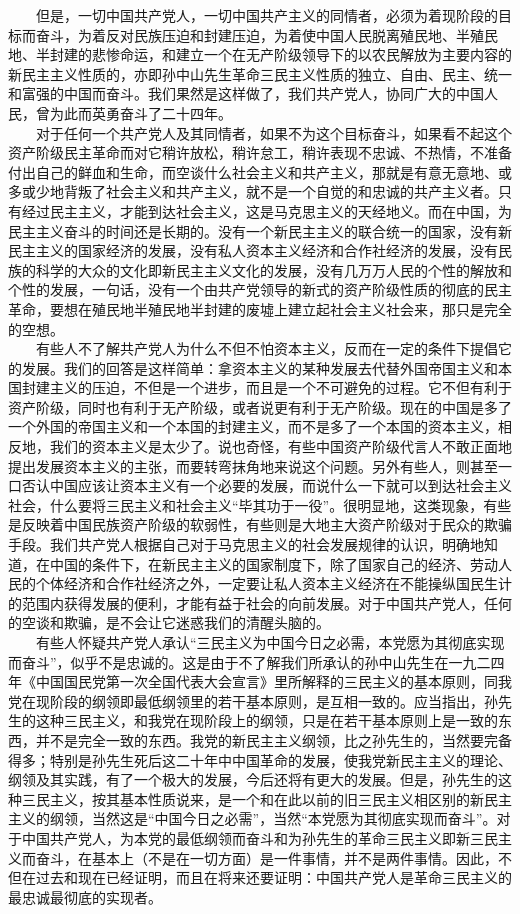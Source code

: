 \documentclass[cn,11pt,chinese]{elegantbook}
\begin{document}
　　但是，一切中国共产党人，一切中国共产主义的同情者，必须为着现阶段的目标而奋斗，为着反对民族压迫和封建压迫，为着使中国人民脱离殖民地、半殖民地、半封建的悲惨命运，和建立一个在无产阶级领导下的以农民解放为主要内容的新民主主义性质的，亦即孙中山先生革命三民主义性质的独立、自由、民主、统一和富强的中国而奋斗。我们果然是这样做了，我们共产党人，协同广大的中国人民，曾为此而英勇奋斗了二十四年。\\
　　对于任何一个共产党人及其同情者，如果不为这个目标奋斗，如果看不起这个资产阶级民主革命而对它稍许放松，稍许怠工，稍许表现不忠诚、不热情，不准备付出自己的鲜血和生命，而空谈什么社会主义和共产主义，那就是有意无意地、或多或少地背叛了社会主义和共产主义，就不是一个自觉的和忠诚的共产主义者。只有经过民主主义，才能到达社会主义，这是马克思主义的天经地义。而在中国，为民主主义奋斗的时间还是长期的。没有一个新民主主义的联合统一的国家，没有新民主主义的国家经济的发展，没有私人资本主义经济和合作社经济的发展，没有民族的科学的大众的文化即新民主主义文化的发展，没有几万万人民的个性的解放和个性的发展，一句话，没有一个由共产党领导的新式的资产阶级性质的彻底的民主革命，要想在殖民地半殖民地半封建的废墟上建立起社会主义社会来，那只是完全的空想。\\
　　有些人不了解共产党人为什么不但不怕资本主义，反而在一定的条件下提倡它的发展。我们的回答是这样简单：拿资本主义的某种发展去代替外国帝国主义和本国封建主义的压迫，不但是一个进步，而且是一个不可避免的过程。它不但有利于资产阶级，同时也有利于无产阶级，或者说更有利于无产阶级。现在的中国是多了一个外国的帝国主义和一个本国的封建主义，而不是多了一个本国的资本主义，相反地，我们的资本主义是太少了。说也奇怪，有些中国资产阶级代言人不敢正面地提出发展资本主义的主张，而要转弯抹角地来说这个问题。另外有些人，则甚至一口否认中国应该让资本主义有一个必要的发展，而说什么一下就可以到达社会主义社会，什么要将三民主义和社会主义“毕其功于一役”。很明显地，这类现象，有些是反映着中国民族资产阶级的软弱性，有些则是大地主大资产阶级对于民众的欺骗手段。我们共产党人根据自己对于马克思主义的社会发展规律的认识，明确地知道，在中国的条件下，在新民主主义的国家制度下，除了国家自己的经济、劳动人民的个体经济和合作社经济之外，一定要让私人资本主义经济在不能操纵国民生计的范围内获得发展的便利，才能有益于社会的向前发展。对于中国共产党人，任何的空谈和欺骗，是不会让它迷惑我们的清醒头脑的。\\
　　有些人怀疑共产党人承认“三民主义为中国今日之必需，本党愿为其彻底实现而奋斗”，似乎不是忠诚的。这是由于不了解我们所承认的孙中山先生在一九二四年《中国国民党第一次全国代表大会宣言》里所解释的三民主义的基本原则，同我党在现阶段的纲领即最低纲领里的若干基本原则，是互相一致的。应当指出，孙先生的这种三民主义，和我党在现阶段上的纲领，只是在若干基本原则上是一致的东西，并不是完全一致的东西。我党的新民主主义纲领，比之孙先生的，当然要完备得多；特别是孙先生死后这二十年中中国革命的发展，使我党新民主主义的理论、纲领及其实践，有了一个极大的发展，今后还将有更大的发展。但是，孙先生的这种三民主义，按其基本性质说来，是一个和在此以前的旧三民主义相区别的新民主主义的纲领，当然这是“中国今日之必需”，当然“本党愿为其彻底实现而奋斗”。对于中国共产党人，为本党的最低纲领而奋斗和为孙先生的革命三民主义即新三民主义而奋斗，在基本上（不是在一切方面）是一件事情，并不是两件事情。因此，不但在过去和现在已经证明，而且在将来还要证明：中国共产党人是革命三民主义的最忠诚最彻底的实现者。\\
\end{document}
